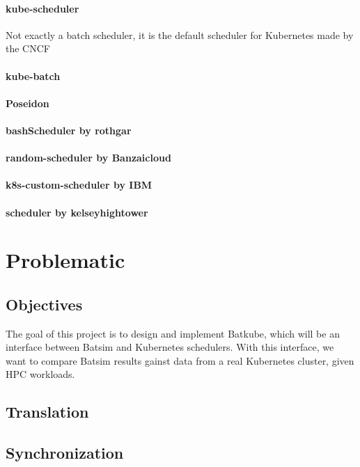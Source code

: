 \documentclass[12pt, a4paper]{memoir}
\begin{document}
\subsubsection{kube-scheduler}
Not exactly a batch scheduler, it is the default scheduler for Kubernetes made
by the CNCF
\subsubsection{kube-batch}
\subsubsection{Poseidon}
\subsubsection{bashScheduler by rothgar}
\subsubsection{random-scheduler by Banzaicloud}
\subsubsection{k8s-custom-scheduler by IBM}
\subsubsection{scheduler by kelseyhightower}

\chapter{Problematic}

\section{Objectives}

The goal of this project is to design and implement Batkube, which will be an
interface between Batsim and Kubernetes schedulers. With this interface, we
want to compare Batsim results gainst data from a real Kubernetes cluster,
given HPC workloads.

\section{Translation}

\section{Synchronization}
\end{document}
